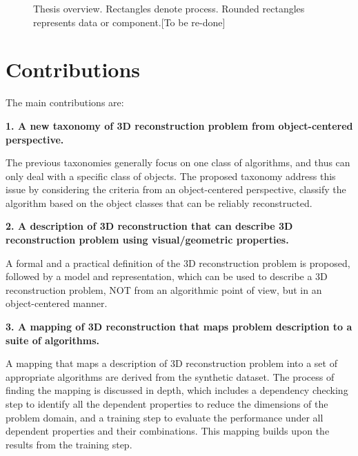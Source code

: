 \begin{figure}[ht]
\caption{Thesis overview. Rectangles denote process. Rounded rectangles represents data or component.[To be re-done]}
\label{fig:system_overview}
\end{figure}

\section{Contributions}
The main contributions are:

\noindent\textbf{1. A new taxonomy of 3D reconstruction problem from object-centered perspective.}

The previous taxonomies generally focus on one class of algorithms, and thus can only deal with a specific class of objects. The proposed taxonomy address this issue by considering the criteria from an object-centered perspective, \ie classify the algorithm based on the object classes that can be reliably reconstructed.

\noindent\textbf{2. A description of 3D reconstruction that can describe 3D reconstruction problem using visual/geometric properties.}

A formal and a practical definition of the 3D reconstruction problem is proposed, followed by a model and representation, which can be used to describe a 3D reconstruction problem, NOT from an algorithmic point of view, but in an object-centered manner.

\noindent\textbf{3. A mapping of 3D reconstruction that maps problem description to a suite of algorithms.}

A mapping that maps a description of 3D reconstruction problem into a set of appropriate algorithms are derived from the synthetic dataset. The process of finding the mapping is discussed in depth, which includes a dependency checking step to identify all the dependent properties to reduce the dimensions of the problem domain, and a training step to evaluate the performance under all dependent properties and their combinations. This mapping builds upon the results from the training step.

